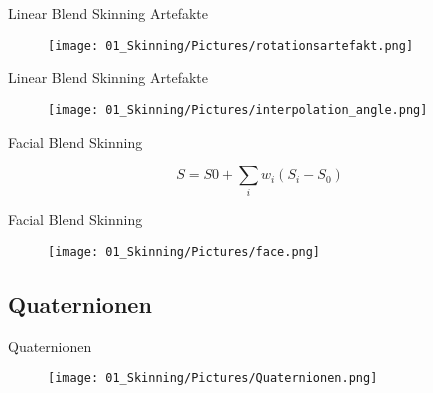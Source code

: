 		\begin{frame}{\Huge{Linear Blend Skinning Artefakte}}
			
			\begin{figure}
				\texttt{[image: 01\_Skinning/Pictures/rotationsartefakt.png]}
			\end{figure}
			
			
			
		\end{frame}
		
				\begin{frame}{\Huge{Linear Blend Skinning Artefakte}}
					
					\begin{figure}
						\texttt{[image: 01\_Skinning/Pictures/interpolation\_angle.png]}
					\end{figure}
					
					
					
				\end{frame}

	\begin{frame}{\Huge{Facial Blend Skinning}}

		
		$$S=S0+\sum_{i}w_{i}(S_{i}-S_{0})$$
		
		
	\end{frame}

				\begin{frame}{\Huge{Facial Blend Skinning}}
					
					\begin{figure}
						\texttt{[image: 01\_Skinning/Pictures/face.png]}
					\end{figure}
					
					
					
				\end{frame}

\subsection{Quaternionen}
				\begin{frame}{\Huge{Quaternionen}}

					\begin{figure}
						\texttt{[image: 01\_Skinning/Pictures/Quaternionen.png]}
					\end{figure}
					
					
					
				\end{frame}
				
